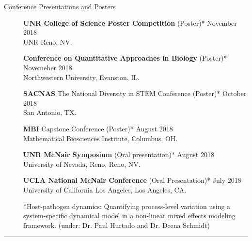 \documentclass{article}
\begin{document}
\begin{description}
	\vspace{-2mm}
	\item[Conference Presentations and Posters]\hspace*{.1in} 
		
		\textbf{UNR College of Science Poster Competition} (Poster)* \hfill{November 2018} \\
		UNR Reno, NV.
		\vspace*{1mm}
		
		\textbf{Conference on Quantitative Approaches in Biology} (Poster)* \hfill{Novemeber 2018} \\
		Northwestern University, Evanston, IL.
		\vspace*{1mm}
		
		\textbf{SACNAS} The National Diversity in STEM Conference (Poster)* \hfill{October 2018} \\
		San Antonio, TX.
		\vspace*{1mm}
		
		\textbf{MBI} Capstone Conference (Poster)* \hfill{August 2018} \\
		Mathematical Biosciences Institute, Columbus, OH.
		\vspace*{1mm}
		
		\textbf{UNR McNair Symposium} (Oral presentation)* \hfill{August 2018} \\ 
		University of Nevada, Reno, Reno, NV.
		\vspace*{1mm}
		
		\textbf{UCLA National McNair Conference} (Oral Presentation)* \hfill{July 2018}\\
		University of California Los Angeles, Los Angeles, CA.
		\vspace*{1mm}
		
		*Host-pathogen dynamics: Quantifying process-level variation using a system-specific dynamical model in a non-linear mixed effects modeling framework. (under: Dr. Paul Hurtado and Dr. Deena Schmidt)
	
\end{description}
\vspace{-2mm}
\rule{\linewidth}{1pt}
\end{document}
